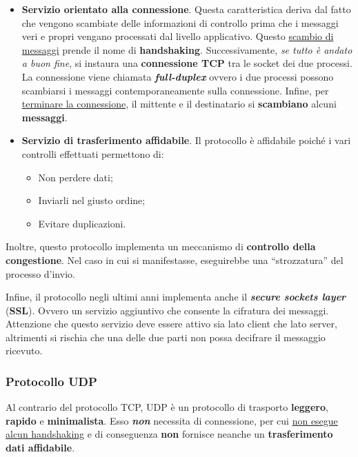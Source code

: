 \documentclass[a4paper]{article}
\newcommand{\dquotes}[1]{``#1''}
\begin{document}
	\begin{itemize}
		\item \textcolor{Green4}{\textbf{Servizio orientato alla connessione}}. Questa caratteristica deriva dal fatto che vengono scambiate delle informazioni di controllo prima che i messaggi veri e propri vengano processati dal livello applicativo. Questo \underline{scambio di messaggi} prende il nome di \textbf{handshaking}.\newline
		Successivamente, \emph{se tutto è andato a buon fine}, si instaura una \textbf{connessione TCP} tra le socket dei due processi. La connessione viene chiamata \textbf{\emph{full-duplex}} ovvero i due processi possono scambiarsi i messaggi contemporaneamente sulla connessione.
		Infine, per \underline{terminare la connessione}, il mittente e il destinatario si \textbf{scambiano} alcuni \textbf{messaggi}.
		
		\item \textcolor{Green4}{\textbf{Servizio di trasferimento affidabile}}. Il protocollo è affidabile poiché i vari controlli effettuati permettono di:
		\begin{itemize}
			\item Non perdere dati;
			\item Inviarli nel giusto ordine;
			\item Evitare duplicazioni.
		\end{itemize}
	\end{itemize}
	
	\noindent
	Inoltre, questo protocollo implementa un meccanismo di \textbf{controllo della congestione}. Nel caso in cui si manifestasse, eseguirebbe una \dquotes{strozzatura} del processo d’invio.\newline
	
	\noindent
	Infine, il protocollo negli ultimi anni implementa anche il \textbf{\emph{secure sockets layer}} (\textbf{SSL}). Ovvero un servizio aggiuntivo che consente la cifratura dei messaggi. Attenzione che questo servizio deve essere attivo sia lato client che lato server, altrimenti si rischia che una delle due parti non possa decifrare il messaggio ricevuto.
	
	\newpage
		
	\subsubsection{Protocollo UDP}\label{protocollo UDP}
	
	Al contrario del protocollo TCP, UDP è un protocollo di trasporto \textbf{leggero}, \textbf{rapido} e \textbf{minimalista}. Esso \emph{\textbf{non}} necessita di connessione, per cui \underline{non esegue} \underline{alcun handshaking} e di conseguenza \textbf{non} fornisce neanche un \textbf{trasferimento dati affidabile}.\newline
	
\end{document}
